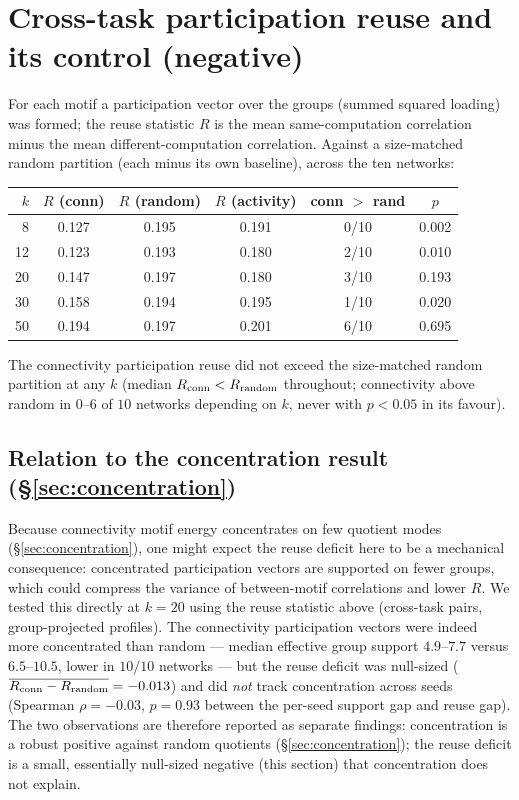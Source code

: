 \documentclass[11pt]{article}
\begin{document}
\section{Cross-task participation reuse and its control (negative)}
\label{sec:reuse}
For each motif a participation vector over the groups (summed squared loading) was formed; the
reuse statistic $R$ is the mean same-computation correlation minus the mean different-computation
correlation. Against a size-matched random partition (each minus its own baseline), across the
ten networks:
\begin{center}\small
\begin{tabular}{rccccc}
\toprule
$k$ & $R$ (conn) & $R$ (random) & $R$ (activity) & conn $>$ rand & $p$ \\
\midrule
8  & 0.127 & 0.195 & 0.191 & 0/10 & 0.002 \\
12 & 0.123 & 0.193 & 0.180 & 2/10 & 0.010 \\
20 & 0.147 & 0.197 & 0.180 & 3/10 & 0.193 \\
30 & 0.158 & 0.194 & 0.195 & 1/10 & 0.020 \\
50 & 0.194 & 0.197 & 0.201 & 6/10 & 0.695 \\
\bottomrule
\end{tabular}
\end{center}
The connectivity participation reuse did not exceed the size-matched random partition at any $k$
(median $R_{\rm conn}<R_{\rm random}$ throughout; connectivity above random in $0$--$6$ of $10$
networks depending on $k$, never with $p<0.05$ in its favour).

\subsection{Relation to the concentration result (\S\ref{sec:concentration})}
Because connectivity motif energy concentrates on few quotient modes (\S\ref{sec:concentration}),
one might expect the reuse deficit here to be a mechanical consequence: concentrated
participation vectors are supported on fewer groups, which could compress the variance of
between-motif correlations and lower $R$. We tested this directly at $k=20$ using the reuse
statistic above (cross-task pairs, group-projected profiles). The connectivity participation
vectors were indeed more concentrated than random --- median effective group support $4.9$--$7.7$
versus $6.5$--$10.5$, lower in $10/10$ networks --- but the reuse deficit was null-sized
($\overline{R_{\rm conn}-R_{\rm random}}=-0.013$) and did \emph{not} track concentration across
seeds (Spearman $\rho=-0.03$, $p=0.93$ between the per-seed support gap and reuse gap). The two
observations are therefore reported as separate findings: concentration is a robust positive
against random quotients (\S\ref{sec:concentration}); the reuse deficit is a small, essentially
null-sized negative (this section) that concentration does not explain.
\end{document}
